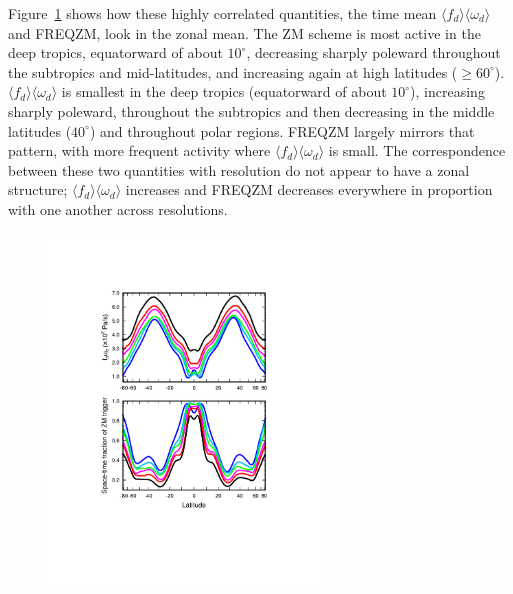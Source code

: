 {Figure~\ref{fig:vomg} shows how these highly correlated quantities, the time mean $\langle f_{d} \rangle \langle \omega_{d} \rangle$ and FREQZM, look in the zonal mean. The ZM scheme is most active in the deep tropics, equatorward of about $10^{\circ}$, decreasing sharply poleward throughout the subtropics and mid-latitudes, and increasing again at high latitudes ($\geq 60^{\circ}$). $\langle f_{d} \rangle \langle \omega_{d} \rangle$ is smallest in the deep tropics (equatorward of about $10^{\circ}$), increasing sharply poleward, throughout the subtropics and then decreasing in the middle latitudes ($40^{\circ}$) and throughout polar regions. FREQZM largely mirrors that pattern, with more frequent activity where $\langle f_{d} \rangle \langle \omega_{d} \rangle$ is small. The correspondence between these two quantities with resolution do not appear to have a zonal structure; $\langle f_{d} \rangle \langle \omega_{d} \rangle$  increases and FREQZM decreases everywhere in proportion with one another across resolutions.

\begin{figure}[t]
\begin{center}
\noindent\includegraphics[width=17pc,angle=0]{chapter6/temp_zonal_fracd*vomgd.pdf}\\
\end{center}
\caption{}
\label{fig:vomg}
\end{figure}

}
